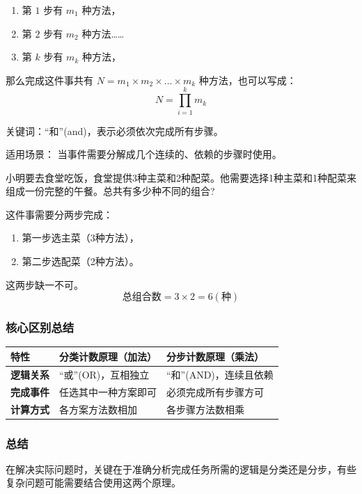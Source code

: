 \begin{enumerate}
  \item 第 \(1\) 步有 \(m_{1}\) 种方法，
  \item 第 \(2\) 步有 \(m_{2}\) 种方法……
  \item 第 \(k\) 步有 \(m_{k}\) 种方法，
\end{enumerate}
那么完成这件事共有 \(N=m_{1}\times m_{2}\times \dots \times m_{k}\) 种方法，也可以写成：
\[ N = \prod_{i=1}^k m_k\]

关键词：“和”(and)，表示必须依次完成所有步骤。

适用场景： 当事件需要分解成几个连续的、依赖的步骤时使用。

\begin{example}
小明要去食堂吃饭，食堂提供3种主菜和2种配菜。他需要选择1种主菜和1种配菜来组成一份完整的午餐。总共有多少种不同的组合?

这件事需要分两步完成：
  \begin{enumerate}
    \item 第一步选主菜（3种方法），
    \item 第二步选配菜（2种方法）。
  \end{enumerate}
  这两步缺一不可。
  \[ \text{总组合数} = 3 \times 2 = 6 (\text{种}) \]

\end{example}

\subsubsection{核心区别总结}

\begin{tabular}{@{}lll@{}}
\toprule
\textbf{特性} & \textbf{分类计数原理（加法）} & \textbf{分步计数原理（乘法）} \\
\midrule
\textbf{逻辑关系} & “或”(OR)，互相独立 & “和”(AND)，连续且依赖 \\
\textbf{完成事件} & 任选其中一种方案即可 & 必须完成所有步骤方可 \\
\textbf{计算方式} & 各方案方法数相加 & 各步骤方法数相乘 \\
\bottomrule
\end{tabular}

\subsubsection{总结}
在解决实际问题时，关键在于准确分析完成任务所需的逻辑是分类还是分步，有些复杂问题可能需要结合使用这两个原理。

